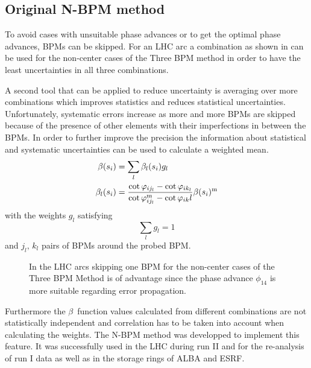 \subsection{Original N-BPM method}

To avoid cases with unsuitable phase advances or to get the optimal phase advances, BPMs can be
skipped. For an LHC arc a combination as shown in  can be used for the non-center
cases of the Three BPM method in order to have the least uncertainties in all three combinations.

A second tool that can be applied to reduce uncertainty is averaging over more combinations which
improves statistics and reduces statistical uncertainties.
Unfortunately, systematic errors increase
as more and more BPMs are skipped because of the presence of other elements with their imperfections in between the
BPMs.
In order to further improve the precision the information about statistical and systematic
uncertainties can be used to calculate a weighted mean. 
%
\begin{align}
    \beta(s_i) &= \sum\limits_{l} \beta_l(s_i) g_l
    \label{eq_beta_wmean}\\
    \beta_l(s_i) &= \frac{\cot\varphi_{ij_l} - \cot\varphi_{ik_l}}{\cot\varphi_{ij_l}^\text{m} - \cot\varphi_{ik}l} \beta(s_i)^\text{m}
    \label{eq_beta_l}
\end{align}
%
with the weights $g_l$ satisfying
%
\begin{equation}
    \sum\limits_l g_l = 1
\end{equation}
%
and $j_l,\,k_l$ pairs of BPMs around the probed BPM.


\begin{figure}
    \centering
    
    \caption{In the LHC arcs skipping one BPM for the non-center cases of the Three BPM Method
    is of advantage since the phase advance $\phi_{14}$
    is more suitable regarding error propagation.}
    \label{fig_skip_one_BPM}
\end{figure}
%
Furthermore the $\beta$~function values calculated from different combinations are not statistically
independent and correlation has to be taken into account when calculating the weights.
The N-BPM method \cite{LangnerNBPM, Langner2017} was developped to implement this feature.
It was successfully used in the LHC during run II and for the re-analysis of run I data
as well as in the storage rings of ALBA and ESRF.

